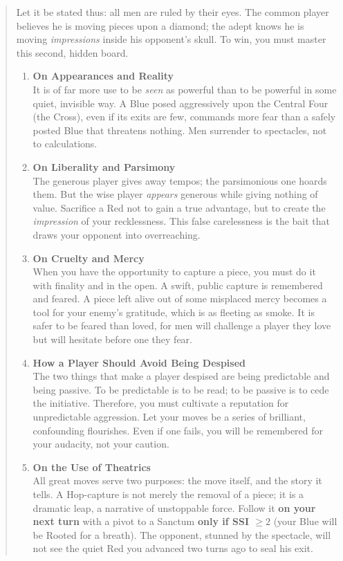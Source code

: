 \documentclass[11pt]{article}
\begin{document}
\begin{quote}\small
Let it be stated thus: all men are ruled by their eyes. The common player believes he is moving pieces upon a diamond; the adept knows he is moving \emph{impressions} inside his opponent's skull. To win, you must master this second, hidden board.

\medskip
\begin{enumerate}[leftmargin=\textit{,label=\textbf{\Roman}.}]
\item \textbf{On Appearances and Reality}\\
It is of far more use to be \emph{seen} as powerful than to be powerful in some quiet, invisible way. A Blue posed aggressively upon the Central Four (the Cross), even if its exits are few, commands more fear than a safely posted Blue that threatens nothing. Men surrender to spectacles, not to calculations.

\item \textbf{On Liberality and Parsimony}\\
The generous player gives away tempos; the parsimonious one hoards them. But the wise player \emph{appears} generous while giving nothing of value. Sacrifice a Red not to gain a true advantage, but to create the \emph{impression} of your recklessness. This false carelessness is the bait that draws your opponent into overreaching.

\item \textbf{On Cruelty and Mercy}\\
When you have the opportunity to capture a piece, you must do it with finality and in the open. A swift, public capture is remembered and feared. A piece left alive out of some misplaced mercy becomes a tool for your enemy's gratitude, which is as fleeting as smoke. It is safer to be feared than loved, for men will challenge a player they love but will hesitate before one they fear.

\item \textbf{How a Player Should Avoid Being Despised}\\
The two things that make a player despised are being predictable and being passive. To be predictable is to be read; to be passive is to cede the initiative. Therefore, you must cultivate a reputation for unpredictable aggression. Let your moves be a series of brilliant, confounding flourishes. Even if one fails, you will be remembered for your audacity, not your caution.

\item \textbf{On the Use of Theatrics}\\
All great moves serve two purposes: the move itself, and the story it tells. A Hop-capture is not merely the removal of a piece; it is a dramatic leap, a narrative of unstoppable force. Follow it \textbf{on your next turn} with a pivot to a Sanctum \textbf{only if SSI $\ge 2$} (your Blue will be Rooted for a breath). The opponent, stunned by the spectacle, will not see the quiet Red you advanced two turns ago to seal his exit.


\end{enumerate}
\end{quote}
\end{document}
